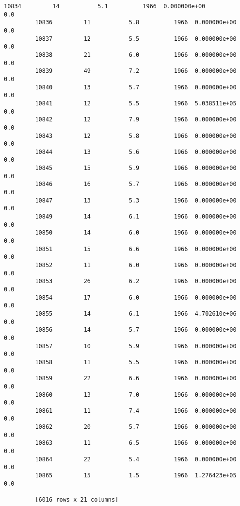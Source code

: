 \documentclass[11pt]{article}
\begin{document}
\begin{Verbatim}[commandchars=\\\{\}]
         10834         14           5.1          1966  0.000000e+00          0.0  
         10836         11           5.8          1966  0.000000e+00          0.0  
         10837         12           5.5          1966  0.000000e+00          0.0  
         10838         21           6.0          1966  0.000000e+00          0.0  
         10839         49           7.2          1966  0.000000e+00          0.0  
         10840         13           5.7          1966  0.000000e+00          0.0  
         10841         12           5.5          1966  5.038511e+05          0.0  
         10842         12           7.9          1966  0.000000e+00          0.0  
         10843         12           5.8          1966  0.000000e+00          0.0  
         10844         13           5.6          1966  0.000000e+00          0.0  
         10845         15           5.9          1966  0.000000e+00          0.0  
         10846         16           5.7          1966  0.000000e+00          0.0  
         10847         13           5.3          1966  0.000000e+00          0.0  
         10849         14           6.1          1966  0.000000e+00          0.0  
         10850         14           6.0          1966  0.000000e+00          0.0  
         10851         15           6.6          1966  0.000000e+00          0.0  
         10852         11           6.0          1966  0.000000e+00          0.0  
         10853         26           6.2          1966  0.000000e+00          0.0  
         10854         17           6.0          1966  0.000000e+00          0.0  
         10855         14           6.1          1966  4.702610e+06          0.0  
         10856         14           5.7          1966  0.000000e+00          0.0  
         10857         10           5.9          1966  0.000000e+00          0.0  
         10858         11           5.5          1966  0.000000e+00          0.0  
         10859         22           6.6          1966  0.000000e+00          0.0  
         10860         13           7.0          1966  0.000000e+00          0.0  
         10861         11           7.4          1966  0.000000e+00          0.0  
         10862         20           5.7          1966  0.000000e+00          0.0  
         10863         11           6.5          1966  0.000000e+00          0.0  
         10864         22           5.4          1966  0.000000e+00          0.0  
         10865         15           1.5          1966  1.276423e+05          0.0  
         
         [6016 rows x 21 columns]
\end{Verbatim}
            
\end{document}
